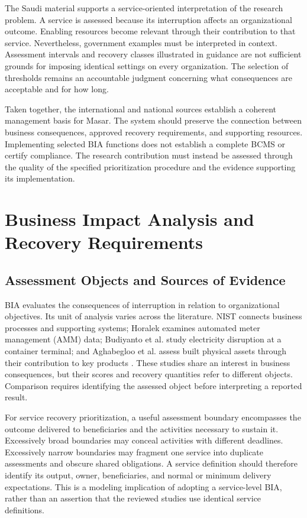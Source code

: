 The Saudi material supports a service-oriented interpretation of the research problem. A service is assessed because its interruption affects an organizational outcome. Enabling resources become relevant through their contribution to that service. Nevertheless, government examples must be interpreted in context. Assessment intervals and recovery classes illustrated in guidance are not sufficient grounds for imposing identical settings on every organization. The selection of thresholds remains an accountable judgment concerning what consequences are acceptable and for how long.

Taken together, the international and national sources establish a coherent management basis for Masar. The system should preserve the connection between business consequences, approved recovery requirements, and supporting resources. Implementing selected BIA functions does not establish a complete BCMS or certify compliance. The research contribution must instead be assessed through the quality of the specified prioritization procedure and the evidence supporting its implementation.

\section{Business Impact Analysis and Recovery Requirements}
\label{sec:lr_bia}

\subsection{Assessment Objects and Sources of Evidence}
\label{sec:lr_bia_process}

BIA evaluates the consequences of interruption in relation to organizational objectives. Its unit of analysis varies across the literature. NIST connects business processes and supporting systems; Horalek examines automated meter management (AMM) data; Budiyanto et al. study electricity disruption at a container terminal; and Aghabegloo et al. assess built physical assets through their contribution to key products \cite{nist2010contingency,amm2023bia,container2021bia,assetcriticality2023}. These studies share an interest in business consequences, but their scores and recovery quantities refer to different objects. Comparison requires identifying the assessed object before interpreting a reported result.

For service recovery prioritization, a useful assessment boundary encompasses the outcome delivered to beneficiaries and the activities necessary to sustain it. Excessively broad boundaries may conceal activities with different deadlines. Excessively narrow boundaries may fragment one service into duplicate assessments and obscure shared obligations. A service definition should therefore identify its output, owner, beneficiaries, and normal or minimum delivery expectations. This is a modeling implication of adopting a service-level BIA, rather than an assertion that the reviewed studies use identical service definitions.

